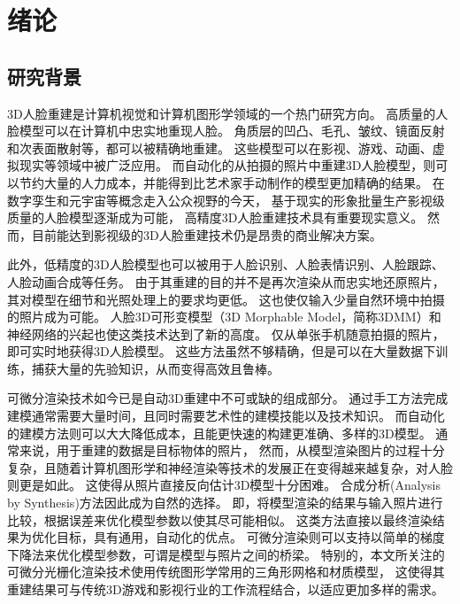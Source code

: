 \chapter{绪论}
\label{chap:intro}

\section{研究背景}

3D人脸重建是计算机视觉和计算机图形学领域的一个热门研究方向。
高质量的人脸模型可以在计算机中忠实地重现人脸。
角质层的凹凸、毛孔、皱纹、镜面反射和次表面散射等，都可以被精确地重建。
这些模型可以在影视、游戏、动画、虚拟现实等领域中被广泛应用。
而自动化的从拍摄的照片中重建3D人脸模型，则可以节约大量的人力成本，并能得到比艺术家手动制作的模型更加精确的结果。
在数字孪生和元宇宙等概念走入公众视野的今天，
基于现实的形象批量生产影视级质量的人脸模型逐渐成为可能，
高精度3D人脸重建技术具有重要现实意义。
然而，目前能达到影视级的3D人脸重建技术仍是昂贵的商业解决方案。

此外，低精度的3D人脸模型也可以被用于人脸识别、人脸表情识别、人脸跟踪、人脸动画合成等任务。
由于其重建的目的并不是再次渲染从而忠实地还原照片，其对模型在细节和光照处理上的要求均更低。
这也使仅输入少量自然环境中拍摄的照片成为可能。
人脸3D可形变模型（3D Morphable Model，简称3DMM）和神经网络的兴起也使这类技术达到了新的高度。
仅从单张手机随意拍摄的照片，即可实时地获得3D人脸模型。
这些方法虽然不够精确，但是可以在大量数据下训练，捕获大量的先验知识，从而变得高效且鲁棒。

可微分渲染技术如今已是自动3D重建中不可或缺的组成部分。
通过手工方法完成建模通常需要大量时间，且同时需要艺术性的建模技能以及技术知识。
而自动化的建模方法则可以大大降低成本，且能更快速的构建更准确、多样的3D模型。
通常来说，用于重建的数据是目标物体的照片，
然而，从模型渲染图片的过程十分复杂，且随着计算机图形学和神经渲染等技术的发展正在变得越来越复杂，对人脸则更是如此。
这使得从照片直接反向估计3D模型十分困难。
合成分析(Analysis by Synthesis)方法因此成为自然的选择。
即，将模型渲染的结果与输入照片进行比较，根据误差来优化模型参数以使其尽可能相似。
这类方法直接以最终渲染结果为优化目标，具有通用，自动化的优点。
可微分渲染则可以支持以简单的梯度下降法来优化模型参数，可谓是模型与照片之间的桥梁。
特别的，本文所关注的可微分光栅化渲染技术使用传统图形学常用的三角形网格和材质模型，
这使得其重建结果可与传统3D游戏和影视行业的工作流程结合，以适应更加多样的需求。

